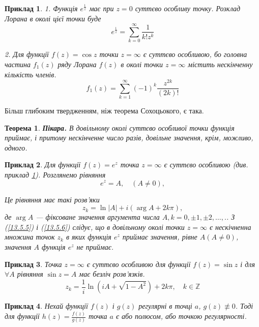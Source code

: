 \documentclass[12pt,fleqn]{article}
\newtheorem{exm}{Приклад}[section]
\theoremstyle{theorem}
\newtheorem{thm}{Теорема}[section]
\theoremstyle{proof}
\numberwithin{figure}{section}
\numberwithin{equation}{section}
\begin{document}
\begin{exm}\label{exm.13.5.1}
  1. Функція $e^{\frac{1}{z}}$ має при $z=0$ суттєво особливу точку. Розклад Лорана в околі цієї точки буде
  $$e^{\frac{1}{z}}=\sum_{k=0}^{\infty}\frac{1}{k!z^k}$$

  2. Для функції $f(z)=\cos z$ точки $z=\infty$ є суттєво особливою, бо головна частина $f_1(z)$ ряду Лорана $f(z)$ в околі точки $z=\infty$ містить нескінченну кількість членів.
  $$f_1(z)=\sum_{k=1}^{\infty}(-1)^k\frac{z^{2k}}{(2k)!}$$
\end{exm}

Більш глибоким твердженням, ніж теорема Сохоцьокого, є така.
\begin{thm}
  \textbf{Пікара.} В довільному околі суттєво особливої точки функція приймає, і притому нескінченне число разів, довільне значення, крім, можливо, одного.
\end{thm}

\begin{exm}\label{exm.13.5.2}
  Для функції $f(z)=e^z$ точка $z=\infty$ є суттєво особливою (див. приклад \ref{exm.13.5.1}). Розглянемо рівняння
  \begin{equation}\label{13.5.5}
    e^z=A, \quad(A\neq 0),
  \end{equation}

  Це рівняння має такі розв'яки
  \begin{equation}\label{13.5.6}
    z_k=\ln|A|+i(\arg A+2k\pi),
  \end{equation}
  де $\arg A$ --- фіксоване значення аргумента числа $A, k=0, \pm 1,\pm 2, \dots,.$. З (\ref{13.5.5}) і (\ref{13.5.6}) слідує, що в довільному околі точки $z=\infty$ є нескічненна множина точок $z_k$ в яких функція $e^z$ приймає значення, рівне $A(A\neq0)$, значення $A$ функція $e^z$ не приймає.
\end{exm}

\begin{exm}
  Точка $z=\infty$ є суттєво особливою для функції $f(z)=\sin z$ і для $\forall A$ рівняння $\sin z = A$ має безліч розв'язків.
  $$z_k=\frac{1}{i}\ln(iA+\sqrt{1-A^2})+2k\pi, \quad k \in \mathbb{Z}$$
\end{exm}

\begin{exm}
  Нехай функції $f(z)$ і $g(z)$ регулярні в точці $a$, $g(z) \not\equiv 0$. Тоді для функції $h(z)=\frac{f(z)}{g(z)}$ точка $a$ є або полюсом, або точкою регулярності.
\end{exm}
\end{document}
